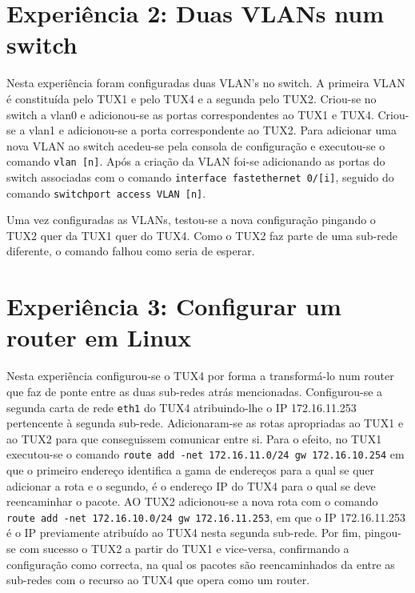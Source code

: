 \documentclass[a4paper,11pt,titlepage]{article}
\begin{document}
\section{Experiência 2: Duas VLANs num switch}

Nesta experiência foram configuradas duas VLAN's no switch. A primeira VLAN é constituída pelo TUX1 e pelo TUX4 e a segunda pelo TUX2. Criou-se no switch a vlan0 e adicionou-se as portas correspondentes ao TUX1 e TUX4. Criou-se a vlan1 e adicionou-se a porta correspondente ao TUX2. Para adicionar uma nova VLAN ao switch acedeu-se pela consola de configuração e executou-se o comando \texttt{vlan [n]}. Após a criação da VLAN foi-se adicionando as portas do switch associadas com o comando \texttt{interface fastethernet 0/[i]}, seguido do comando \texttt{switchport access VLAN [n]}.

Uma vez configuradas as VLANs, testou-se a nova configuração pingando o TUX2 quer da TUX1 quer do TUX4. Como o TUX2 faz parte de uma sub-rede diferente, o comando falhou como seria de esperar.

\section{Experiência 3: Configurar um router em Linux}
Nesta experiência configurou-se o TUX4 por forma a transformá-lo num router que faz de ponte entre as duas sub-redes atrás mencionadas. Configurou-se a segunda carta de rede \texttt{eth1} do TUX4 atribuindo-lhe o IP 172.16.11.253 pertencente à segunda sub-rede.
Adicionaram-se as rotas apropriadas ao TUX1 e ao TUX2 para que conseguissem comunicar entre si. Para o efeito, no TUX1 executou-se o comando \texttt{route add -net 172.16.11.0/24 gw 172.16.10.254} em que o primeiro endereço identifica a gama de endereços para a qual se quer adicionar a rota e o segundo, é o endereço IP do TUX4 para o qual se deve reencaminhar o pacote. AO TUX2 adicionou-se a nova rota com o comando \texttt{route add -net 172.16.10.0/24 gw 172.16.11.253}, em que o IP 172.16.11.253 é o IP previamente atribuído ao TUX4 nesta segunda sub-rede. Por fim, pingou-se com sucesso o TUX2 a partir do TUX1 e vice-versa, confirmando a configuração como correcta, na qual os pacotes são reencaminhados da entre as sub-redes com o recurso ao TUX4 que opera como um router.
\end{document}
